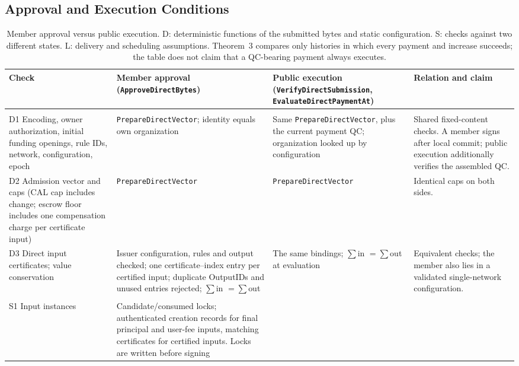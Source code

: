 \subsection{Approval and Execution Conditions}
\begingroup\small
\renewcommand{\arraystretch}{1.15}
\begin{longtable}{@{}>{\raggedright\arraybackslash}p{}>{\raggedright\arraybackslash}p{}>{\raggedright\arraybackslash}p{}>{\raggedright\arraybackslash}p{}@{}}
\caption{Member approval versus public execution. D: deterministic functions of the
submitted bytes and static configuration. S: checks against two different states.
L: delivery and scheduling assumptions. Theorem~3 compares only histories in which every
payment and increase succeeds; the table does not claim that a QC-bearing payment
always executes.}
\label{tab:sup-checks}\\
\hline
Check & Member approval (\texttt{Approve\allowbreak DirectBytes}) & Public execution (\texttt{VerifyDirect\allowbreak Submission}, \texttt{EvaluateDirect\allowbreak PaymentAt}) & Relation and claim \\
\hline
\multicolumn{4}{@{}l}{\textit{D. Deterministic}} \\
D1 Encoding, owner authorization, initial funding openings, rule IDs, network, configuration, epoch
 & \texttt{PrepareDirect\allowbreak Vector}; identity equals own organization
 & Same \texttt{PrepareDirect\allowbreak Vector}, plus the current payment QC; organization looked up by configuration
 & Shared fixed-content checks. A member signs after local commit; public execution additionally verifies the assembled QC. \\
D2 Admission vector and caps (CAL cap includes change; escrow floor includes one compensation charge per certificate input)
 & \texttt{PrepareDirect\allowbreak Vector}
 & \texttt{PrepareDirect\allowbreak Vector}
 & Identical caps on both sides. \\
D3 Direct input certificates; value conservation
 & Issuer configuration, rules and output checked; one certificate--index entry per certified input; duplicate OutputIDs and unused entries rejected; $\sum$in $=\sum$out
 & The same bindings; $\sum$in $=\sum$out at evaluation
 & Equivalent checks; the member also lies in a validated single-network configuration. \\
\hline
\multicolumn{4}{@{}l}{\textit{S. State}} \\
S1 Input instances
 & Candidate/consumed locks; authenticated creation records for final principal and user-fee inputs, matching certificates for certified inputs. Locks are written before signing

\end{longtable}
